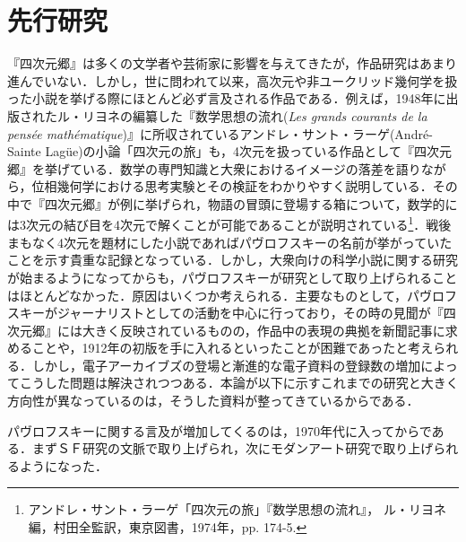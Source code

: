 \section{先行研究}
『四次元郷』は多くの文学者や芸術家に影響を与えてきたが，作品研究はあまり進んでいない．しかし，世に問われて以来，高次元や非ユークリッド幾何学を扱った小説を挙げる際にほとんど必ず言及される作品である．例えば，1948年に出版されたル・リヨネの編纂した『数学思想の流れ(\emph{Les grands courants de la pensée mathématique})』に所収されているアンドレ・サント・ラーゲ(André-Sainte Lagüe)の小論「四次元の旅」も，4次元を扱っている作品として『四次元郷』を挙げている．数学の専門知識と大衆におけるイメージの落差を語りながら，位相幾何学における思考実験とその検証をわかりやすく説明している．その中で『四次元郷』が例に挙げられ，物語の冒頭に登場する箱について，数学的には3次元の結び目を4次元で解くことが可能であることが説明されている\footnote{アンドレ・サント・ラーゲ「四次元の旅」『数学思想の流れ』， ル・リヨネ編，村田全監訳，東京図書，1974年，pp. 174-5.}．戦後まもなく4次元を題材にした小説であればパヴロフスキーの名前が挙がっていたことを示す貴重な記録となっている．しかし，大衆向けの科学小説に関する研究が始まるようになってからも，パヴロフスキーが研究として取り上げられることはほとんどなかった．原因はいくつか考えられる．主要なものとして，パヴロフスキーがジャーナリストとしての活動を中心に行っており，その時の見聞が『四次元郷』には大きく反映されているものの，作品中の表現の典拠を新聞記事に求めることや，1912年の初版を手に入れるといったことが困難であったと考えられる．しかし，電子アーカイブズの登場と漸進的な電子資料の登録数の増加によってこうした問題は解決されつつある．本論が以下に示すこれまでの研究と大きく方向性が異なっているのは，そうした資料が整ってきているからである．

パヴロフスキーに関する言及が増加してくるのは，1970年代に入ってからである．まずＳＦ研究の文脈で取り上げられ，次にモダンアート研究で取り上げられるようになった．

